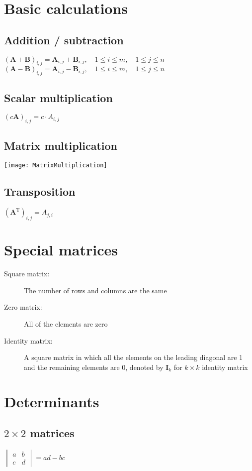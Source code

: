 \section{Basic calculations}
\subsection{Addition / subtraction}
$(\mathbf {A}+\mathbf {B})_{i,j}=\mathbf {A}_{i,j}+{\mathbf {B}}_{i,j},\quad 1\leq i\leq m,\quad 1\leq j\leq n$\\
$(\mathbf {A}-\mathbf {B})_{i,j}=\mathbf {A}_{i,j}-{\mathbf {B}}_{i,j},\quad 1\leq i\leq m,\quad 1\leq j\leq n$
\subsection{Scalar multiplication}
$(c\mathbf{A})_{i,j}=c\cdot A_{i,j}$
\subsection{Matrix multiplication}
\texttt{[image: MatrixMultiplication]}

\subsection{Transposition}
$(\mathbf{A}^\mathrm{T})_{i,j}=A_{j,i}$

\section{Special matrices}
\begin{description}
    \item[Square matrix:] The number of rows and columns are the same
    \item[Zero matrix:] All of the elements are zero
    \item[Identity matrix:] A square matrix in which all the elements on the leading diagonal are 1 and the remaining elements are 0, denoted by $\mathbf{I}_k$ for $k\times k$ identity matrix
\end{description}


\section{Determinants}

\subsection{$2\times2$ matrices}
$\begin{vmatrix}a&b\\c&d\end{vmatrix}=ad-bc$

